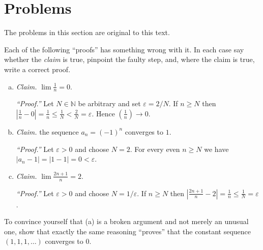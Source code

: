 		


\section{Problems}

\noindent The problems in this section are original to this text.

\begin{problem}
Each of the following ``proofs'' has something wrong with it.  In each case say whether the \emph{claim} is true, pinpoint the faulty step, and, where the claim is true, write a correct proof.
\begin{enumerate}[(a)]
	\item \emph{Claim.} $\lim \frac{1}{n} = 0$.

	\emph{``Proof.''}  Let $N \in \mathbb{N}$ be arbitrary and set $\varepsilon = 2/N$.  If $n \geq N$ then $\left|\frac{1}{n} - 0\right| = \frac{1}{n} \leq \frac{1}{N} < \frac{2}{N} = \varepsilon$.  Hence $\left(\frac{1}{n}\right) \to 0$.
	\item \emph{Claim.} the sequence $a_n = (-1)^n$ converges to $1$.

	\emph{``Proof.''}  Let $\varepsilon > 0$ and choose $N = 2$.  For every even $n \geq N$ we have $|a_n - 1| = |1 - 1| = 0 < \varepsilon$.
	\item \emph{Claim.} $\lim \frac{2n+1}{n} = 2$.

	\emph{``Proof.''}  Let $\varepsilon > 0$ and choose $N = 1/\varepsilon$.  If $n \geq N$ then $\left|\frac{2n+1}{n} - 2\right| = \frac{1}{n} \leq \frac{1}{N} = \varepsilon$.
\end{enumerate}
To convince yourself that (a) is a broken argument and not merely an unusual one, show that exactly the same reasoning ``proves'' that the constant sequence $(1, 1, 1, \ldots)$ converges to $0$.
\end{problem}

